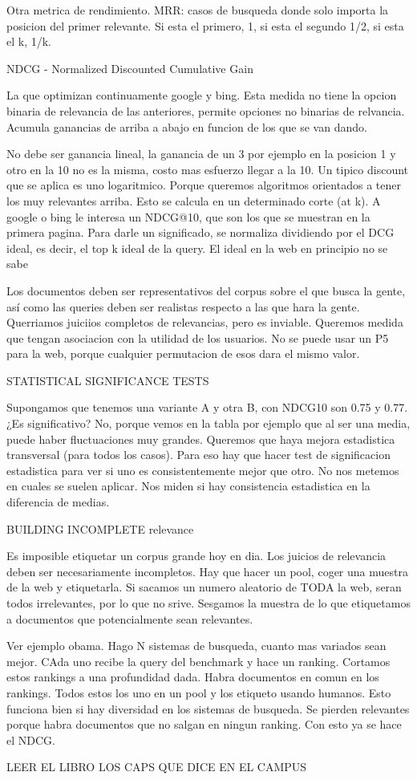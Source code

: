 Otra metrica de rendimiento. MRR: casos de busqueda donde solo importa la posicion del primer relevante. Si esta el primero, 1, si esta el segundo 1/2, si esta el k, 1/k. 


NDCG - Normalized Discounted Cumulative Gain

La que optimizan continuamente google y bing. Esta medida no tiene la opcion binaria de relevancia de las anteriores, permite opciones no binarias de relvancia. Acumula ganancias de arriba a abajo en funcion de los que se van dando. 

No debe ser ganancia lineal, la ganancia de un 3 por ejemplo en la posicion 1 y otro en la 10 no es la misma, costo mas esfuerzo llegar a la 10. Un tipico discount que se aplica es uno logaritmico. Porque queremos algoritmos orientados a tener los muy relevantes arriba. Esto se calcula en un determinado corte (at k). A google o bing le interesa un NDCG@10, que son los que se muestran en la primera pagina. Para darle un significado, se normaliza dividiendo por el DCG ideal, es decir, el top k ideal de la query. El ideal en la web en principio no se sabe

Los documentos deben ser representativos del corpus sobre el que busca la gente, así como las queries deben ser realistas respecto a las que hara la gente. Querriamos juiciios completos de relevancias, pero es inviable. Queremos medida que tengan asociacion con la utilidad de los usuarios. No se puede usar un P\@ 5 para la web, porque cualquier permutacion de esos dara el mismo valor. 


STATISTICAL SIGNIFICANCE TESTS 

Supongamos que tenemos una variante A y otra B, con NDCG\@10 son 0.75 y 0.77. ¿Es significativo? No, porque vemos en la tabla por ejemplo que al ser una media, puede haber fluctuaciones muy grandes. Queremos que haya mejora estadistica transversal (para todos los casos). Para eso hay que hacer test de significacion estadistica para ver si uno es consistentemente mejor que otro. No nos metemos en cuales se suelen aplicar. Nos miden si hay consistencia estadistica en la diferencia de medias.



BUILDING INCOMPLETE relevance

Es imposible etiquetar un corpus grande hoy en dia. Los juicios de relevancia deben ser necesariamente incompletos. Hay que hacer un pool, coger una muestra de la web y etiquetarla. Si sacamos un numero aleatorio de TODA la web, seran todos irrelevantes, por lo que no srive. Sesgamos la muestra de lo que etiquetamos a documentos que potencialmente sean relevantes. 

Ver ejemplo obama. Hago N sistemas de busqueda, cuanto mas variados sean mejor. CAda uno recibe la query del benchmark y hace un ranking. Cortamos estos rankings a una profundidad dada. Habra documentos en comun en los rankings. Todos estos los uno en un pool y los etiqueto usando humanos. Esto funciona bien si hay diversidad en los sistemas de busqueda. Se pierden relevantes porque habra documentos que no salgan en ningun ranking. Con esto ya se hace el NDCG.  



LEER EL LIBRO LOS CAPS QUE DICE EN EL CAMPUS